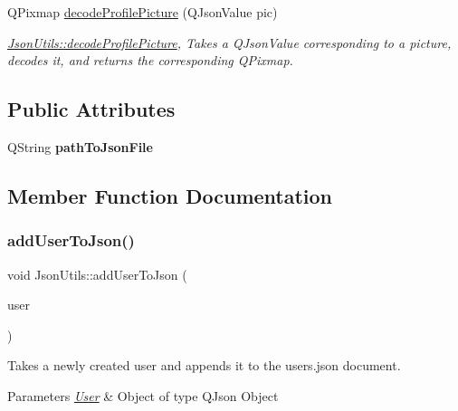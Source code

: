 \begin{DoxyCompactItemize}
Q\+Pixmap \hyperlink{classJsonUtils_aec5239b893c527428ed31a7ba05eba97}{decode\+Profile\+Picture} (Q\+Json\+Value pic)
\begin{DoxyCompactList}\small\item\em \hyperlink{classJsonUtils_aec5239b893c527428ed31a7ba05eba97}{Json\+Utils\+::decode\+Profile\+Picture}, Takes a Q\+Json\+Value corresponding to a picture, decodes it, and returns the corresponding Q\+Pixmap. \end{DoxyCompactList}\end{DoxyCompactItemize}
\subsection*{Public Attributes}
\begin{DoxyCompactItemize}
\item 
\mbox{\label{classJsonUtils_a62ef956f6d79a2935be9fe199fc285b5}} 
Q\+String {\bfseries path\+To\+Json\+File}
\end{DoxyCompactItemize}


\subsection{Member Function Documentation}
\mbox{\label{classJsonUtils_a9626b00d2b338602731abac985a77063}} 
\subsubsection{\texorpdfstring{add\+User\+To\+Json()}{addUserToJson()}}
{\footnotesize\ttfamily void Json\+Utils\+::add\+User\+To\+Json (\begin{DoxyParamCaption}\item[{Q\+Json\+Object}]{user }\end{DoxyParamCaption})}



Takes a newly created user and appends it to the users.\+json document. 


\begin{DoxyParams}{Parameters}
{\em \hyperlink{classUser}{User}} & Object of type Q\+Json Object \\
\hline
\end{DoxyParams}
\mbox{\label{classJsonUtils_aec5239b893c527428ed31a7ba05eba97}} 
